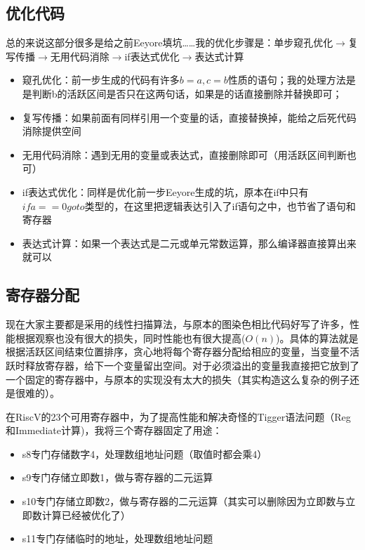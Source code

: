 \documentclass{ctexart}
\begin{document}
\subsection{优化代码}

总的来说这部分很多是给之前Eeyore填坑……我的优化步骤是：单步窥孔优化$\rightarrow$复写传播$\rightarrow$无用代码消除$\rightarrow$if表达式优化$\rightarrow$表达式计算

\begin{itemize}
  \item 窥孔优化：前一步生成的代码有许多$b = a, c = b$性质的语句；我的处理方法是是判断b的活跃区间是否只在这两句话，如果是的话直接删除并替换即可；
  \item 复写传播：如果前面有同样引用一个变量的话，直接替换掉，能给之后死代码消除提供空间
  \item 无用代码消除：遇到无用的变量或表达式，直接删除即可（用活跃区间判断也可）
  \item if表达式优化：同样是优化前一步Eeyore生成的坑，原本在if中只有$if a == 0 goto$类型的，在这里把逻辑表达引入了if语句之中，也节省了语句和寄存器
  \item 表达式计算：如果一个表达式是二元或单元常数运算，那么编译器直接算出来就可以
\end{itemize}

\subsection{寄存器分配}

现在大家主要都是采用的线性扫描算法，与原本的图染色相比代码好写了许多，性能根据观察也没有很大的损失，同时性能也有很大提高($O(n)$)。具体的算法就是根据活跃区间结束位置排序，贪心地将每个寄存器分配给相应的变量，当变量不活跃时释放寄存器，给下一个变量留出空间。对于必须溢出的变量我直接把它放到了一个固定的寄存器中，与原本的实现没有太大的损失（其实构造这么复杂的例子还是很难的）。

在RiscV的23个可用寄存器中，为了提高性能和解决奇怪的Tigger语法问题（Reg和Immediate计算)，我将三个寄存器固定了用途：
\begin{itemize}
  \item s8专门存储数字4，处理数组地址问题（取值时都会乘4）
  \item s9专门存储立即数1，做与寄存器的二元运算
  \item s10专门存储立即数2，做与寄存器的二元运算（其实可以删除因为立即数与立即数计算已经被优化了）
  \item s11专门存储临时的地址，处理数组地址问题
\end{itemize}
\end{document}
